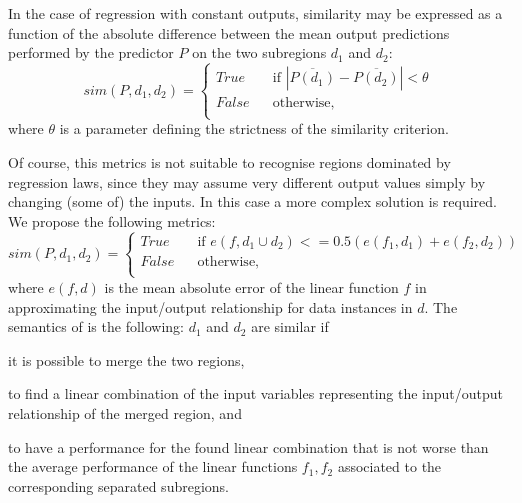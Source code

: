 \documentclass[
]{ceurart}
\begin{document}
In the case of regression with constant outputs, similarity may be expressed as a function of the absolute difference between the mean output predictions performed by the predictor $P$ on the two subregions $d_1$ and $d_2$:
%
\begin{equation}
	sim(P, d_1, d_2) = 
	\begin{cases}
		True \text{~~~~~~if~} |\overline{P(d_1)} - \overline{P(d_2)}| < \theta\\
		False \text{~~~~~otherwise},\\
	\end{cases}\,\label{eq:simRegK}
\end{equation}
%
where $\theta$ is a parameter defining the strictness of the similarity criterion.

Of course, this metrics is not suitable to recognise regions dominated by regression laws, since they may assume very different output values simply by changing (some of) the inputs.
%
In this case a more complex solution is required.
%
We propose the following metrics:
\begin{equation}
	sim(P, d_1, d_2) = 
	\begin{cases}
		True \text{~~~~~~if~} e(f, d_1 \cup d_2) <= 0.5 (e(f_1, d_1) + e(f_2, d_2))\\
		False \text{~~~~~otherwise,}\\
	\end{cases}\,\label{eq:simRegLin}
\end{equation}
where $e(f, d)$ is the mean absolute error of the linear function $f$ in approximating the input/output relationship for data instances in $d$.
%
The semantics of  is the following: $d_1$ and $d_2$ are similar if
\begin{inlinelist}
	\item it is possible to merge the two regions,
	\item to find a linear combination of the input variables representing the input/output relationship of the merged region, and
	\item to have a performance for the found linear combination that is not worse than the average performance of the linear functions $f_1, f_2$ associated to the corresponding separated subregions.
\end{inlinelist}


\end{document}
